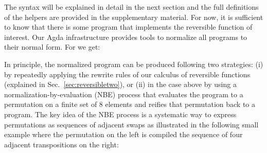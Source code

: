 
\resettwo{}

\noindent The syntax will be explained in detail in the next section and the full definitions of the helpers are provided in the
supplementary material. For now, it is sufficient to know that there is some program that implements the reversible
function of interest. Our Agda infrastructure provides tools to normalize all programs to their normal form. For
 we get:

\resetnormtwo{}

In principle, the normalized program can be produced following two strategies: (i) by repeatedly applying the rewrite
rules of our calculus of reversible functions (explained in Sec.~\ref{sec:reversibletwo}), or (ii) in the case above by
using a normalization-by-evaluation (NBE) process that evaluates the program to a permutation on a finite set of 8
elements and reifies that permutation back to a program. The key idea of the NBE process is a systematic way to express
permutations as sequences of adjacent swaps as illustrated in the following small example where the permutation on the
left is compiled the sequence of four adjacent transpositions on the right:



